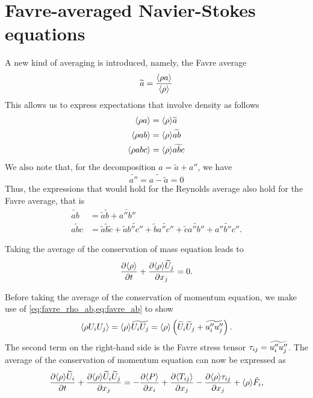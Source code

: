 \documentclass[oneside,a4paper,11pt]{report}
\begin{document}
\section{Favre-averaged Navier-Stokes equations}
A new kind of averaging is introduced, namely, the Favre average
\begin{equation}
    \widetilde{a} = \frac{\left < \rho a \right >}{\langle \rho \rangle} 
\end{equation}
This allows us to express expectations that involve density as follows
\begin{align}
    \left < \rho a \right > & = \langle \rho \rangle \widetilde{a} \label{eq:favre_rho_a} \\
    \left < \rho ab \right > & = \langle \rho \rangle \widetilde{ab} \label{eq:favre_rho_ab} \\
    \left < \rho abc \right > & = \langle \rho \rangle \widetilde{abc} \label{eq:favre_rho_abc} 
\end{align}
We also note that, for the decomposition $a = \widetilde{a} + a''$, we have
\begin{equation}
    \widetilde{a''} = \widetilde{a - \widetilde{a}} = 0
\end{equation}
Thus, the expressions that would hold for the Reynolds average also hold for the Favre average, that is
\begin{align}
    \widetilde{ab} &= \widetilde{a}\widetilde{b} + \widetilde{a''b''} \label{eq:favre_ab} \\
    \widetilde{abc} & = \widetilde{a}\widetilde{b}\widetilde{c} + \widetilde{a} \widetilde{b''c''} + \widetilde{b} \widetilde{a''c''} + \widetilde{c}\widetilde{a''b''} + \widetilde{a''b''c''}. \label{eq:favre_abc}
\end{align}

Taking the average of the conservation of mass equation leads to
\begin{equation}
\frac{\partial \langle \rho \rangle}{\partial t} + \frac{\partial \langle \rho \rangle \widetilde{U}_j}{\partial x_j} = 0.
\end{equation}

Before taking the average of the conservation of momentum equation, we make use of \cref{eq:favre_rho_ab,eq:favre_ab} to show
\begin{equation}
\label{eq:mom_flux_expansion}
    \left < \rho U_i U_j \right > = \langle \rho \rangle \widetilde{U_i U_j} = \langle \rho \rangle \left ( \widetilde{U}_i \widetilde{U}_j + \widetilde{u_i'' u_j''} \right).
\end{equation}
The second term on the right-hand side is the Favre stress tensor $\tau_{ij} = \widetilde{u_i'' u_j''}$. The average of the conservation of momentum equation can now be expressed as 
\begin{equation}
\frac{\partial \langle \rho \rangle \widetilde{U}_i}{\partial t} + \frac{\partial \langle \rho \rangle \widetilde{U}_i \widetilde{U}_j}{\partial x_j} = -\frac{\partial \langle P \rangle}{\partial x_i} + \frac{\partial \langle T_{ij} \rangle}{\partial x_j} - \frac{\partial \langle \rho \rangle \tau_{ij} }{\partial x_j} + \langle \rho \rangle \tilde{F}_i,
\end{equation}
\end{document}
